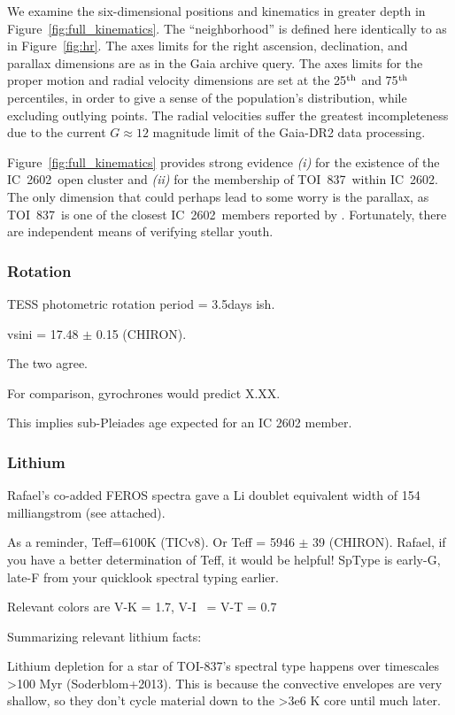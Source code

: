 \documentclass[12pt,twocolumn,tighten]{aastex62}
\newcommand{\tn}{TOI~837} %
\newcommand{\cn}{IC~2602} %
\begin{document}
We examine the six-dimensional positions and kinematics in greater
depth in Figure~\ref{fig:full_kinematics}.  The ``neighborhood'' is
defined here identically to as in Figure~\ref{fig:hr}.  The axes
limits for the right ascension, declination, and parallax dimensions
are as in the Gaia archive query.  The axes limits for the proper
motion and radial velocity dimensions are set at the 25$^{\rm th}$ and
75$^{\rm th}$ percentiles, in order to give a sense of the
population's distribution, while excluding outlying points.  The
radial velocities suffer the greatest incompleteness due to the
current $G\approx12$ magnitude limit of the Gaia-DR2 data processing.

Figure~\ref{fig:full_kinematics} provides strong evidence {\it (i)} for the
existence of the \cn\ open cluster and {\it (ii)} for the membership
of \tn\ within \cn.
The only dimension that could perhaps lead to some worry is the
parallax, as \tn\ is one of the closest \cn\ members reported by
\citet{cantatgaudin_gaia_2018}.
Fortunately, there are independent means of verifying stellar youth.


\subsubsection{Rotation}

TESS photometric rotation period = 3.5days ish.

vsini = 17.48 $\pm$ 0.15 (CHIRON).

The two agree.

For comparison, gyrochrones would predict X.XX.

This implies sub-Pleiades age expected for an IC 2602 member.

\subsubsection{Lithium}

Rafael's co-added FEROS spectra gave a Li doublet equivalent width of
154 milliangstrom (see attached).

As a reminder, Teff=6100K (TICv8). 
Or Teff = 5946 $\pm$ 39 (CHIRON).
Rafael, if you have a better
determination of Teff, it would be helpful!  SpType is early-G,
late-F from your quicklook spectral typing earlier.

Relevant colors are V-K = 1.7,  V-I ~= V-T = 0.7

Summarizing relevant lithium facts:

Lithium depletion for a star of TOI-837's spectral type happens
over timescales >100 Myr (Soderblom+2013). This is because the
convective envelopes are very shallow, so they don't cycle material
down to the >3e6 K core until much later.
\end{document}

